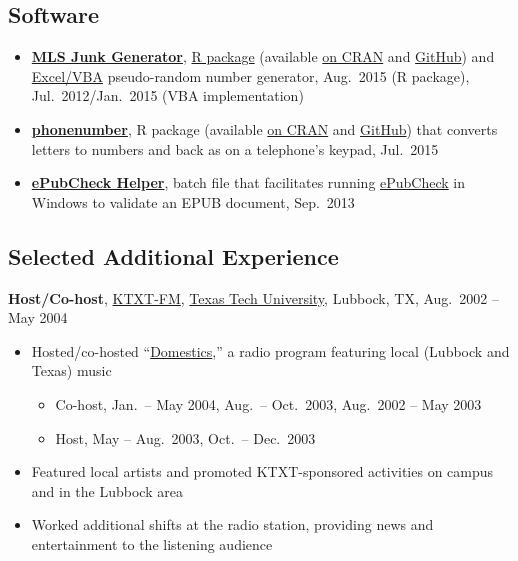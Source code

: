 \documentclass[
]{article}
\providecommand{\tightlist}{%
  \setlength{\itemsep}{0pt}\setlength{\parskip}{0pt}}
\begin{document}
\hypertarget{software}{%
\subsection{Software}\label{software}}

\begin{itemize}
\tightlist
\item
  \href{https://steve.mylesandmyles.info/projects/mls-junk-generator/}{\textbf{MLS
  Junk Generator}}, \href{https://stevemyles.site/mlsjunkgen/}{R
  package} (available
  \href{https://cran.r-project.org/web/packages/mlsjunkgen/}{on CRAN}
  and \href{https://github.com/scumdogsteev/mlsjunkgen}{GitHub}) and
  \href{https://github.com/scumdogsteev/mls-junk-generator}{Excel/VBA}
  pseudo-random number generator, Aug.~2015 (R package),
  Jul.~2012/Jan.~2015 (VBA implementation)
\item
  \href{https://stevemyles.site/phonenumber/}{\textbf{phonenumber}}, R
  package (available
  \href{https://cran.r-project.org/web/packages/phonenumber/}{on CRAN}
  and \href{https://github.com/scumdogsteev/phonenumber}{GitHub}) that
  converts letters to numbers and back as on a telephone's keypad,
  Jul.~2015
\item
  \href{https://steve.mylesandmyles.info/projects/epc-helper/}{\textbf{ePubCheck
  Helper}}, batch file that facilitates running
  \href{https://github.com/IDPF/epubcheck}{ePubCheck} in Windows to
  validate an EPUB document, Sep.~2013
\end{itemize}

\hypertarget{selected-additional-experience}{%
\subsection{Selected Additional
Experience}\label{selected-additional-experience}}

\textbf{Host/Co-host}, \href{https://www.ktxtfm.org/raider/}{KTXT-FM},
\href{https://www.ttu.edu/}{Texas Tech University}, Lubbock, TX,
Aug.~2002 -- May 2004

\begin{itemize}
\tightlist
\item
  Hosted/co-hosted
  ``\href{http://steve.mylesandmyles.info/projects/domestics/}{Domestics},''
  a radio program featuring local (Lubbock and Texas) music

  \begin{itemize}
  \tightlist
  \item
    Co-host, Jan.~-- May 2004, Aug.~-- Oct.~2003, Aug.~2002 -- May 2003
  \item
    Host, May -- Aug.~2003, Oct.~-- Dec.~2003
  \end{itemize}
\item
  Featured local artists and promoted KTXT-sponsored activities on
  campus and in the Lubbock area
\item
  Worked additional shifts at the radio station, providing news and
  entertainment to the listening audience
\end{itemize}
\end{document}
